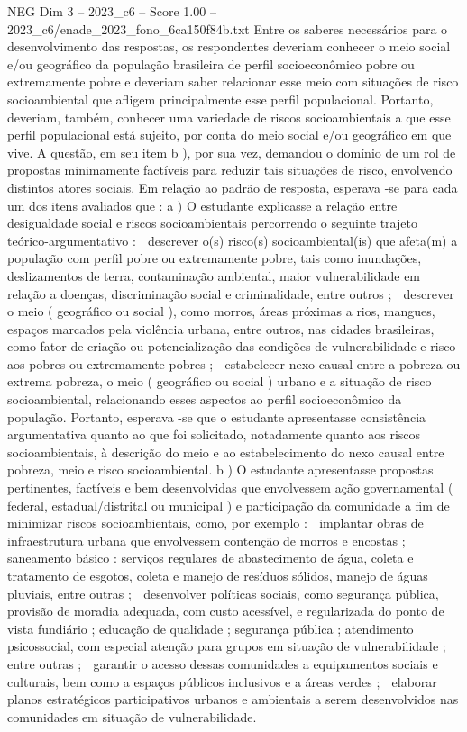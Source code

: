 \begin{textsample}{NEG Dim 3 – 2023\_c6 – Score 1.00 – 2023\_c6/enade\_2023\_fono\_6ca150f84b.txt}
Entre os saberes necessários para o desenvolvimento das respostas, os respondentes deveriam conhecer o meio social e/ou geográfico da população brasileira de perfil socioeconômico pobre ou extremamente pobre e deveriam saber relacionar esse meio com situações de risco socioambiental que afligem principalmente esse perfil populacional.
Portanto, deveriam, também, conhecer uma variedade de riscos socioambientais a que esse perfil populacional está sujeito, por conta do meio social e/ou geográfico em que vive.
A questão, em seu item b ), por sua vez, demandou o domínio de um rol de propostas minimamente factíveis para reduzir tais situações de risco, envolvendo distintos atores sociais.
Em relação ao padrão de resposta, esperava -se para cada um dos itens avaliados que : a ) O estudante explicasse a relação entre desigualdade social e riscos socioambientais percorrendo o seguinte trajeto teórico-argumentativo :  descrever o(s) risco(s) socioambiental(is) que afeta(m) a população com perfil pobre ou extremamente pobre, tais como inundações, deslizamentos de terra, contaminação ambiental, maior vulnerabilidade em relação a doenças, discriminação social e criminalidade, entre outros ;  descrever o meio ( geográfico ou social ), como morros, áreas próximas a rios, mangues, espaços marcados pela violência urbana, entre outros, nas cidades brasileiras, como fator de criação ou potencialização das condições de vulnerabilidade e risco aos pobres ou extremamente pobres ;  estabelecer nexo causal entre a pobreza ou extrema pobreza, o meio ( geográfico ou social ) urbano e a situação de risco socioambiental, relacionando esses aspectos ao perfil socioeconômico da população.
Portanto, esperava -se que o estudante apresentasse consistência argumentativa quanto ao que foi solicitado, notadamente quanto aos riscos socioambientais, à descrição do meio e ao estabelecimento do nexo causal entre pobreza, meio e risco socioambiental. b ) O estudante apresentasse propostas pertinentes, factíveis e bem desenvolvidas que envolvessem ação governamental ( federal, estadual/distrital ou municipal ) e participação da comunidade a fim de minimizar riscos socioambientais, como, por exemplo :  implantar obras de infraestrutura urbana que envolvessem contenção de morros e encostas ; saneamento básico : serviços regulares de abastecimento de água, coleta e tratamento de esgotos, coleta e manejo de resíduos sólidos, manejo de águas pluviais, entre outras ;  desenvolver políticas sociais, como segurança pública, provisão de moradia adequada, com custo acessível, e regularizada do ponto de vista fundiário ; educação de qualidade ; segurança pública ; atendimento psicossocial, com especial atenção para grupos em situação de vulnerabilidade ; entre outras ;  garantir o acesso dessas comunidades a equipamentos sociais e culturais, bem como a espaços públicos inclusivos e a áreas verdes ;  elaborar planos estratégicos participativos urbanos e ambientais a serem desenvolvidos nas comunidades em situação de vulnerabilidade.

\end{textsample}

